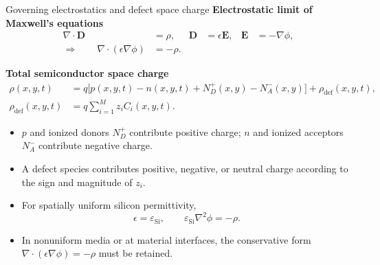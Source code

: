 \documentclass[aspectratio=169,10pt]{beamer}
\newcommand{\Evec}{\mathbf{E}}
\newcommand{\Dvec}{\mathbf{D}}
\newcommand{\rhodef}{\rho_{\mathrm{def}}}
\newcommand{\epssi}{\varepsilon_{\mathrm{Si}}}
\begin{document}
\begin{frame}{Governing electrostatics and defect space charge}
\small
\textbf{Electrostatic limit of Maxwell's equations}
\vspace{-0.25em}
\begin{align*}
\nabla\cdot\Dvec &= \rho, & \Dvec &= \epsilon\Evec, & \Evec&=-\nabla\phi,\\[-0.15em]
\Rightarrow\qquad
\nabla\cdot(\epsilon\nabla\phi) &= -\rho.
\end{align*}

\vspace{0.15em}
\textbf{Total semiconductor space charge}
\vspace{-0.15em}
\begin{align*}
\rho(x,y,t)
&= q\big[p(x,y,t)-n(x,y,t)+N_D^+(x,y)-N_A^-(x,y)\big]+\rhodef(x,y,t),\\[-0.05em]
\rhodef(x,y,t)
&= q\sum_{i=1}^{M} z_i C_i(x,y,t).
\end{align*}

\vspace{0.15em}
\begin{itemize}
    \item $p$ and ionized donors $N_D^+$ contribute positive charge; $n$ and ionized acceptors $N_A^-$ contribute negative charge.
    \item A defect species contributes positive, negative, or neutral charge according to the sign and magnitude of $z_i$.
    \item For spatially uniform silicon permittivity,
    \[
        \epsilon=\epssi,
        \qquad
        \epssi \nabla^2\phi=-\rho.
    \]
    \item In nonuniform media or at material interfaces, the conservative form $\nabla\cdot(\epsilon\nabla\phi)=-\rho$ must be retained.
\end{itemize}
\end{frame}
\end{document}
